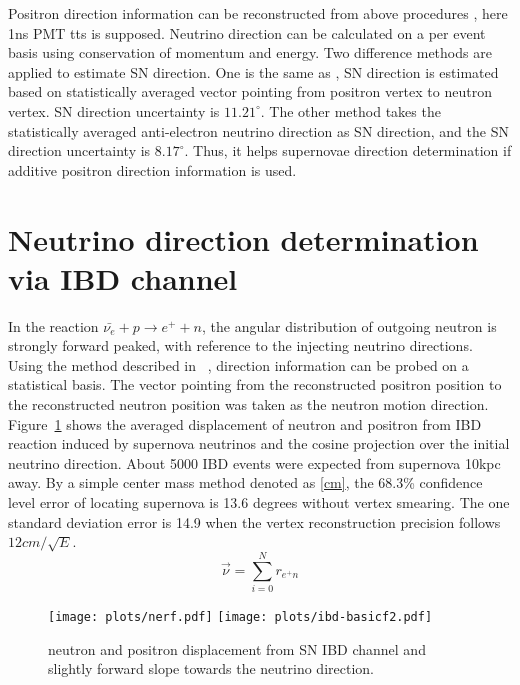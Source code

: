 \documentclass[a4paper,10pt]{cpc-hepnp}
\begin{document}
Positron direction information can be reconstructed from above procedures , here 1ns PMT tts is supposed.
Neutrino direction can be calculated on a per event basis using conservation of momentum and energy.
Two difference methods are applied to estimate SN direction. One is the same as \cite{nudir},
SN direction is estimated based on statistically averaged vector pointing from positron vertex to neutron vertex.
SN direction uncertainty is $11.21^{\circ}$. The other method takes the statistically averaged
anti-electron neutrino direction as SN direction, and the SN direction uncertainty is $8.17^{\circ}$.
Thus, it helps supernovae direction determination if additive positron direction information is used.


\section{ Neutrino direction determination via IBD channel}
\label{sec:intro}
In the reaction $\bar{\nu_{e}}+p \rightarrow e^{+}+n$, the
angular distribution of outgoing neutron is strongly forward peaked, with
reference to the injecting neutrino directions. Using the method described in
~\cite{chooz}, direction information can be probed on a  statistical basis.
The vector pointing from the reconstructed positron position to the
reconstructed neutron position was taken as the neutron motion direction.
Figure~\ref{ibd-basicplot} shows the averaged displacement of neutron and
positron from IBD reaction induced by supernova neutrinos and the cosine
projection over the initial neutrino direction. About 5000 IBD events were expected from
supernova 10kpc away. By a simple center mass method denoted as \eqref{cm},
the 68.3\% confidence level error of locating supernova is 13.6 degrees without
vertex smearing. The one standard deviation error is 14.9 when the vertex
reconstruction precision follows $12cm/\sqrt{E}$.
\begin{equation}
\label{cm}
\vec{\nu} = \sum_{i=0}^{N}r_{e^{+}n}
\end{equation}

\begin{figure}[htbp]
\centering %
\texttt{[image: plots/nerf.pdf]}
\hfill
\texttt{[image: plots/ibd-basicf2.pdf]}
\caption{\label{ibd-basicplot} neutron and positron displacement from SN IBD
channel and slightly forward slope towards the neutrino direction.}
\end{figure}
\end{document}
